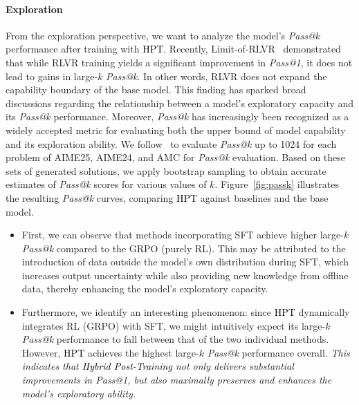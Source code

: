 \documentclass{article} %
\newcommand{\0}{\mathbb{0}}
\newcommand{\1}{\mathbb{1}}
\newcommand{\method}{\textcolor{black}{Hybrid Post-Training}\xspace}
\newcommand{\mot}{\textcolor{black}{HPT}\xspace}
\begin{document}
\paragraph{\textcolor{cyan!40!black}{Exploration}}
From the exploration perspective, we want to analyze the model’s \emph{Pass@k} performance after training with \mot.
Recently, Limit-of-RLVR~\citep{yue2025does} demonstrated that while RLVR training yields a significant improvement in \emph{Pass@1}, it does not lead to gains in large-$k$ \emph{Pass@k}.
In other words, RLVR does not expand the capability boundary of the base model.
This finding has sparked broad discussions regarding the relationship between a model’s exploratory capacity and its \emph{Pass@k} performance. Moreover, \emph{Pass@k} has increasingly been recognized as a widely accepted metric for evaluating both the upper bound of model capability and its exploration ability.
We follow~\citet{yue2025does} to evaluate \emph{Pass@k} up to 1024 for each problem of AIME25, AIME24, and AMC for \emph{Pass@k} evaluation.
Based on these sets of generated solutions, we apply bootstrap sampling to obtain accurate estimates of \emph{Pass@k} scores for various values of $k$.
Figure~\ref{fig:passk} illustrates the resulting \emph{Pass@k} curves, comparing \mot against baselines and the base model.

\begin{itemize}[leftmargin=2em]
    \item 
    First, we can observe that methods incorporating SFT achieve higher large-$k$ \emph{Pass@k} compared to the GRPO (purely RL).
    This may be attributed to the introduction of data outside the model’s own distribution during SFT, which increases output uncertainty while also providing new knowledge from offline data, thereby enhancing the model’s exploratory capacity.
    \item 
    Furthermore, we identify an interesting phenomenon: since \mot dynamically integrates RL (GRPO) with SFT, we might intuitively expect its large-$k$ \emph{Pass@k} performance to fall between that of the two individual methods.
    However, \mot achieves the highest large-$k$ \emph{Pass@k} performance overall.
    \emph{This indicates that \method not only delivers substantial improvements in Pass@1, but also maximally preserves and enhances the model’s exploratory ability.}
\end{itemize}
\end{document}
